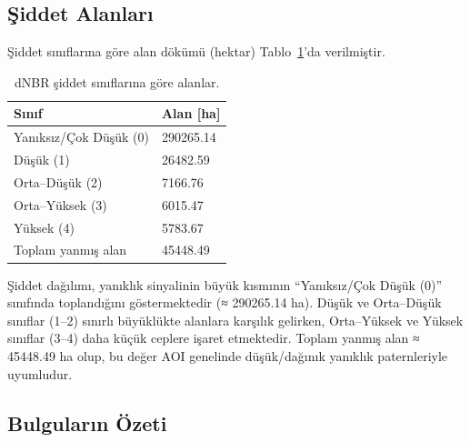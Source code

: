 \documentclass[11pt,a4paper]{article}
\begin{document}
\subsection{Şiddet Alanları}
Şiddet sınıflarına göre alan dökümü (hektar) Tablo~\ref{tab:areas}'da verilmiştir.
\begin{table}[H]
  \centering
  \begin{tabular}{@{}ll@{}}
  \toprule
  Sınıf & Alan [ha] \\
  \midrule
  Yanıksız/Çok Düşük (0) & \num{290265.14} \\
  Düşük (1) & \num{26482.59} \\
  Orta--Düşük (2) & \num{7166.76} \\
  Orta--Yüksek (3) & \num{6015.47} \\
  Yüksek (4) & \num{5783.67} \\
  Toplam yanmış alan & \num{45448.49} \\
  \bottomrule
  \end{tabular}
  \caption{dNBR şiddet sınıflarına göre alanlar.}
  \label{tab:areas}
\end{table}

\noindent Şiddet dağılımı, yanıklık sinyalinin büyük kısmının “Yanıksız/Çok Düşük (0)” sınıfında toplandığını göstermektedir (≈ \num{290265.14} ha). Düşük ve Orta–Düşük sınıflar (1–2) sınırlı büyüklükte alanlara karşılık gelirken, Orta–Yüksek ve Yüksek sınıflar (3–4) daha küçük ceplere işaret etmektedir. Toplam yanmış alan ≈ \num{45448.49} ha olup, bu değer AOI genelinde düşük/dağınık yanıklık paternleriyle uyumludur.


\subsection*{Bulguların Özeti}
\begin{center}
\end{center}
\end{document}
